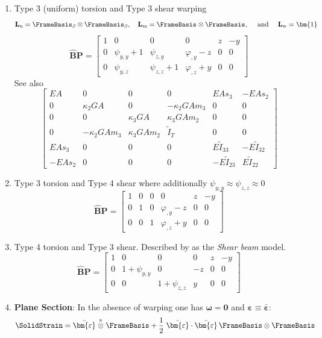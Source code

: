 \begin{enumerate}
\item Type 3 (uniform) torsion and Type 3 shear warping
$$
\mathbf{L}_{\mathrm{n}} = \FrameBasis_{\beta} \otimes \FrameBasis_{\beta}, \quad
\mathbf{L}_{\mathrm{m}} = \FrameBasis_{} \otimes \FrameBasis_{},
\quad\text{ and }\quad
\mathbf{L}_{\mathrm{w}} = \bm{1}
$$
$$
\hat{\bm{B}}\mathbf{P} = \left[\begin{matrix}
1 & 0 & 0 & 0 & z & - y \\
0 & \psi_{y,y} + 1 & \psi_{z,y} & \varphi_{,y} - z & 0 & 0 \\
0 & \psi_{y,z} & \psi_{z,z} + 1 & \varphi_{,z} + y & 0 & 0
\end{matrix}\right]
$$
%
See also \citep{wackerfuss2009mixed}
\begin{equation*}
\left[\begin{array}{cccccc}
E A & 0 & 0 & 0 & E A s_3 & -E A s_2 \\
0 & \kappa_2 G A & 0 & -\kappa_2 G A m_3 & 0 & 0 \\
0 & 0 & \kappa_3 G A & \kappa_3 G A m_2 & 0 & 0 \\
0 & -\kappa_2 G A m_3 & \kappa_3 G A m_2 & \widetilde{I}_T & 0 & 0 \\
E A s_3 & 0 & 0 & 0 & E \widetilde{I}_{33} & -E \widetilde{I}_{32} \\
-E A s_2 & 0 & 0 & 0 & -E \widetilde{I}_{23} & E \widetilde{I}_{22}
\end{array}\right]
\end{equation*}

\item Type 3 torsion and Type 4 shear  \citep{gruttmann1998geometrical} where additionally \(\psi_{y,y}  \approx \psi_{z,z} \approx 0\)
$$
\hat{\bm{B}}\mathbf{P} = \left[\begin{matrix}
1 & 0 & 0 & 0 & z & - y \\
0 & 1 & 0 & \varphi_{,y} - z & 0 & 0 \\
0 & 0 & 1 & \varphi_{,z} + y & 0 & 0
\end{matrix}\right]
$$

\item Type 4 torsion and Type 3 shear. Described by \cite{lecorvec2012nonlinear} as the \emph{Shear beam} model.
$$
\hat{\bm{B}}\mathbf{P} = \left[\begin{matrix}
1 & 0 & 0 & 0 & z & - y \\
0 & 1+\psi_{y,y} & 0 & - z & 0 & 0 \\
0 & 0 & 1+\psi_{z,z} &   y & 0 & 0
\end{matrix}\right]
$$
\item \textbf{Plane Section}: In the absence of warping one has $\bm{\omega}=\bm{0}$ and $\bm{\varepsilon}\equiv \bar{\bm{\varepsilon}}$:
$$
\SolidStrain = \bar{\bm{\varepsilon}}
\stackrel{\mathrm{s}}{\otimes}
\FrameBasis 
+ \frac{1}{2}\left.
\bar{\bm{\varepsilon}}\cdot\bar{\bm{\varepsilon}}\,\FrameBasis\otimes\FrameBasis\right. \\
$$


\end{enumerate}
